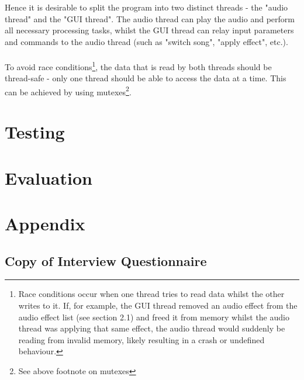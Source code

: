\documentclass{article}
\begin{document}
	Hence it is desirable to split the program into two distinct threads - the "audio thread" and the "GUI thread". The audio thread can play the audio and perform all necessary processing tasks, whilst the GUI thread can relay input parameters and commands to the audio thread (such as "switch song", "apply effect", etc.).
	
	\paragraph{}
	To avoid race conditions\footnote{
		 Race conditions occur when one thread tries to read data whilst the other writes to it. If, for example, the GUI thread removed an audio effect from the audio effect list (see section 2.1) and freed it from memory whilst the audio thread was applying that same effect, the audio thread would suddenly be reading from invalid memory, likely resulting in a crash or undefined behaviour.
	}, the data that is read by both threads should be thread-safe - only one thread should be able to access the data at a time. This can be achieved by using mutexes\footnote{See above footnote on mutexes}.
	
	\section {  Testing }
	
	\section {  Evaluation }
	
	\section { Appendix  }
	
	\subsection{Copy of Interview Questionnaire}
	
\end{document}
